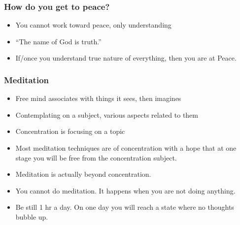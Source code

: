 \begin{frame}[fragile]\frametitle{How do you get to peace?}

	\begin{itemize}
	\item You cannot work toward peace, only understanding
	\item ``The name of God is truth.''
	\item If/once you understand true nature of everything, then you are at Peace.
	\end{itemize}

\end{frame}

\begin{frame}[fragile]\frametitle{Meditation}

	\begin{itemize}

	\item Free mind associates with things it sees, then imagines
	\item Contemplating on a subject, various aspects related to them
	\item Concentration is focusing on a topic
	\item Most meditation techniques are of concentration with a hope that at one stage you will be free from the concentration subject. 
	\item Meditation is actually beyond concentration. 
	\item You cannot do meditation. It happens when you are not doing anything. 
	\item Be still 1 hr a day. On one day you will reach a state where no thoughts bubble up.
	\end{itemize}

\end{frame}
